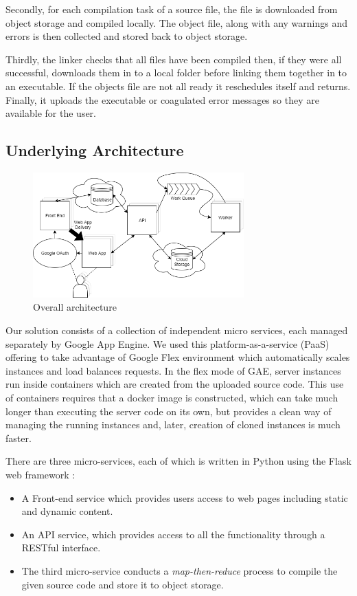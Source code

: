 \documentclass[conference]{IEEEtran}
\begin{document}
Secondly, for each compilation task of a source file, the file is downloaded
from object storage and compiled locally. The object file, along with any
warnings and errors is then collected and stored back to object storage.

Thirdly, the linker checks that all files have been compiled then, if they were
all successful, downloads them in to a local folder before linking them together
in to an executable. If the objects file are not all ready it reschedules
itself and returns. Finally, it uploads the executable or coagulated error
messages so they are available for the user.

\subsection{Underlying Architecture}
\begin{figure}[ht] %
    \centering
    \includegraphics[width=3.2in]{OverallArchitecture.png}
    \caption{Overall architecture}
    \label{fig:underlying}
\end{figure}

Our solution consists of a collection of independent micro services, each
managed separately by Google App Engine. We used this platform-as-a-service
(PaaS) offering to take advantage of Google Flex\cite{GAE} environment which
automatically scales instances and load balances requests. In the flex mode of GAE,
server instances run inside containers which are created from the uploaded
source code. This use of containers requires that a docker image is constructed,
which can take much longer than executing the server code on its own, but provides a clean
way of managing the running instances and, later, creation of cloned instances
is much faster.

There are three micro-services, each of which is written in Python using the
Flask web framework \cite{Flask}:
\begin{itemize}
\item A Front-end service which provides users access to web
pages including static and dynamic content.

\item An API service, which provides
access to all the functionality through a RESTful interface.

\item The third micro-service conducts a \emph{map-then-reduce} process to
compile the given source code and store it to object storage.
\end{itemize}
\end{document}

